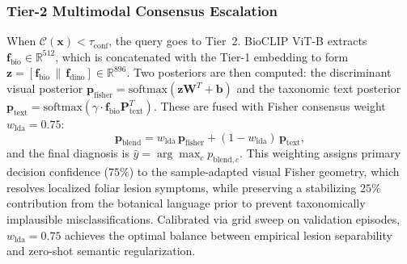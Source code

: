 \subsubsection{Tier-2 Multimodal Consensus Escalation}
When $\mathcal{C}(\mathbf{x}) < \tau_{\text{conf}}$, the query goes to Tier~2. BioCLIP ViT-B extracts $\mathbf{f}_{\text{bio}} \in \mathbb{R}^{512}$, which is concatenated with the Tier-1 embedding to form $\mathbf{z} = [\mathbf{f}_{\text{bio}} \,\|\, \mathbf{f}_{\text{dino}}] \in \mathbb{R}^{896}$. Two posteriors are then computed: the discriminant visual posterior $\mathbf{p}_{\text{fisher}} = \text{softmax}(\mathbf{z}\mathbf{W}^T + \mathbf{b})$ and the taxonomic text posterior $\mathbf{p}_{\text{text}} = \text{softmax}(\gamma \cdot \mathbf{f}_{\text{bio}}\mathbf{P}_{\text{text}}^T)$. These are fused with Fisher consensus weight $w_{\text{lda}} = 0.75$:
\begin{equation}
    \label{eq:multimodal_blend}
    \mathbf{p}_{\text{blend}} = w_{\text{lda}} \, \mathbf{p}_{\text{fisher}} + (1 - w_{\text{lda}}) \, \mathbf{p}_{\text{text}},
\end{equation}
and the final diagnosis is $\hat{y} = \arg\max_c p_{\text{blend}, c}$. This weighting assigns primary decision confidence ($75\%$) to the sample-adapted visual Fisher geometry, which resolves localized foliar lesion symptoms, while preserving a stabilizing $25\%$ contribution from the botanical language prior to prevent taxonomically implausible misclassifications. Calibrated via grid sweep on validation episodes, $w_{\text{lda}} = 0.75$ achieves the optimal balance between empirical lesion separability and zero-shot semantic regularization.

